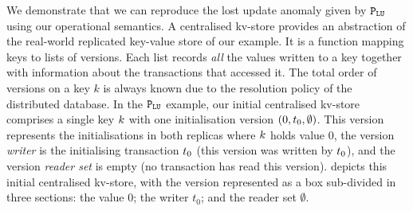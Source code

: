We demonstrate that we can reproduce the lost update anomaly given by
\(\mathtt{P}_{\mathtt{LU}}\) using our operational semantics.  A
centralised kv-store provides an abstraction of the real-world
replicated key-value store of our example.  It is a function mapping
keys to lists of {versions}.  Each list records {\em all} the values
written to a key together with information about the transactions that
accessed it. The total order of versions on a key $k$ is always known
due to the resolution policy of the distributed database. 
In the \(\mathtt{P}_{\mathtt{LU}}\) example, our initial centralised
kv-store comprises a single key \(k\)  with  one initialisation version \((0, t_{0}, \emptyset)\).
This version represents the initialisations in both replicas where \(k\) holds value \(0\), 
 the version \emph{writer} is the initialising transaction
\(t_0\) (this version was written by \(t_0\)), 
and  the version \emph{reader set} is empty (no transaction has read this version). 
 depicts this initial centralised kv-store, with the version
represented as a box sub-divided in three sections: the value \(0\);
the writer \(t_0\); and the reader set \(\emptyset\). 

